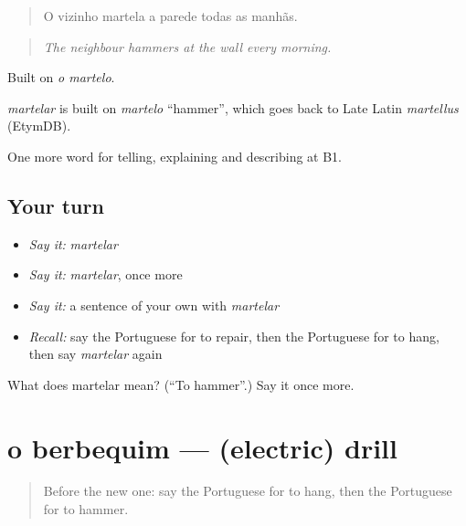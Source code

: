 \begin{quote}
O vizinho martela a parede todas as manhãs.
\end{quote}

\begin{quote}
\emph{The neighbour hammers at the wall every morning.}
\end{quote}

Built on \emph{o martelo}.

\begin{cousinweb}
\emph{martelar} is built on \emph{martelo} \textquotedblleft{}hammer\textquotedblright{}, which goes back to Late Latin \emph{martellus} (EtymDB).
\end{cousinweb}

\begin{grammarlens}[title={What you've built}]
One more word for telling, explaining and describing at B1.
\end{grammarlens}

\subsection*{Your turn}
\begin{itemize}
\raggedright
  \item \emph{Say it:} \emph{martelar}
  \item \emph{Say it:} \emph{martelar}, once more
  \item \emph{Say it:} a sentence of your own with \emph{martelar}
  \item \emph{Recall:} say the Portuguese for to repair, then the Portuguese for to hang, then say \emph{martelar} again
\end{itemize}

\begin{tcolorbox}[breakable,colback=teal!4,colframe=teal!35!black,title={Before you move on}]
What does martelar mean? (\textquotedblleft{}To hammer\textquotedblright{}.) Say it once more.
\end{tcolorbox}
\section[o berbequim]{o berbequim — (electric) drill}

\label{lesson:PT-C531-berbequim}



\begin{quote}
Before the new one: say the Portuguese for to hang, then the Portuguese for to hammer.
\end{quote}

